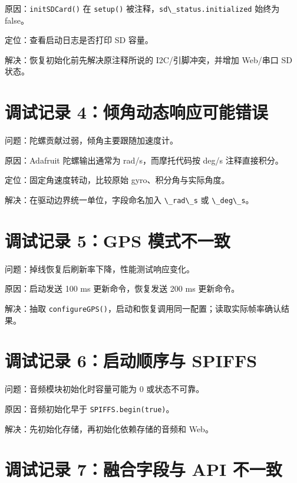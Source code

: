 \documentclass[
  UTF8,11pt,a4paper]{ctexart}
\newcommand{\passthrough}[1]{#1}
\begin{document}
原因：\passthrough{\lstinline!initSDCard()!} 在
\passthrough{\lstinline!setup()!}
被注释，\passthrough{\lstinline!sd\_status.initialized!} 始终为 false。

定位：查看启动日志是否打印 SD 容量。

解决：恢复初始化前先解决原注释所说的 I2C/引脚冲突，并增加 Web/串口 SD
状态。

\section{调试记录
4：倾角动态响应可能错误}\label{ux8c03ux8bd5ux8bb0ux5f55-4ux503eux89d2ux52a8ux6001ux54cdux5e94ux53efux80fdux9519ux8bef}

问题：陀螺贡献过弱，倾角主要跟随加速度计。

原因：Adafruit 陀螺输出通常为 rad/s，而摩托代码按 deg/s 注释直接积分。

定位：固定角速度转动，比较原始 gyro、积分角与实际角度。

解决：在驱动边界统一单位，字段命名加入
\passthrough{\lstinline!\_rad\_s!} 或
\passthrough{\lstinline!\_deg\_s!}。

\section{调试记录 5：GPS
模式不一致}\label{ux8c03ux8bd5ux8bb0ux5f55-5gps-ux6a21ux5f0fux4e0dux4e00ux81f4}

问题：掉线恢复后刷新率下降，性能测试响应变化。

原因：启动发送 100 ms 更新命令，恢复发送 200 ms 更新命令。

解决：抽取
\passthrough{\lstinline!configureGPS()!}，启动和恢复调用同一配置；读取实际帧率确认结果。

\section{调试记录 6：启动顺序与
SPIFFS}\label{ux8c03ux8bd5ux8bb0ux5f55-6ux542fux52a8ux987aux5e8fux4e0e-spiffs}

问题：音频模块初始化时容量可能为 0 或状态不可靠。

原因：音频初始化早于 \passthrough{\lstinline!SPIFFS.begin(true)!}。

解决：先初始化存储，再初始化依赖存储的音频和 Web。

\section{调试记录 7：融合字段与 API
不一致}\label{ux8c03ux8bd5ux8bb0ux5f55-7ux878dux5408ux5b57ux6bb5ux4e0e-api-ux4e0dux4e00ux81f4}
\end{document}
